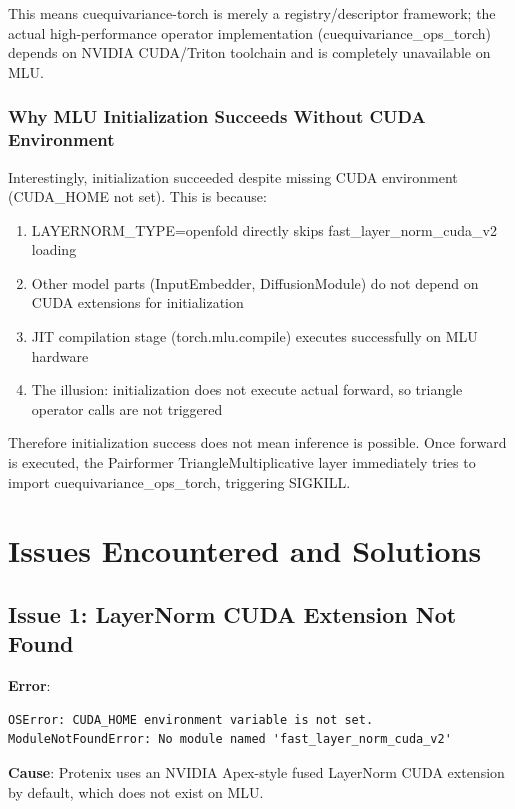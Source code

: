 \documentclass[12pt,a4paper]{article}
\begin{document}
This means cuequivariance-torch is merely a registry/descriptor framework; the actual high-performance operator implementation (cuequivariance_ops_torch) depends on NVIDIA CUDA/Triton toolchain and is completely unavailable on MLU.

\subsubsection{Why MLU Initialization Succeeds Without CUDA Environment}

Interestingly, initialization succeeded despite missing CUDA environment (CUDA_HOME not set). This is because:
\begin{enumerate}
    \item LAYERNORM_TYPE=openfold directly skips fast_layer_norm_cuda_v2 loading
    \item Other model parts (InputEmbedder, DiffusionModule) do not depend on CUDA extensions for initialization
    \item JIT compilation stage (torch.mlu.compile) executes successfully on MLU hardware
    \item The illusion: initialization does not execute actual forward, so triangle operator calls are not triggered
\end{enumerate}

Therefore initialization success does not mean inference is possible. Once forward is executed, the Pairformer TriangleMultiplicative layer immediately tries to import cuequivariance_ops_torch, triggering SIGKILL.

\clearpage

\section{Issues Encountered and Solutions}

\subsection{Issue 1: LayerNorm CUDA Extension Not Found}

\textbf{Error}:
\begin{verbatim}
OSError: CUDA_HOME environment variable is not set.
ModuleNotFoundError: No module named 'fast_layer_norm_cuda_v2'
\end{verbatim}

\textbf{Cause}: Protenix uses an NVIDIA Apex-style fused LayerNorm CUDA extension by default, which does not exist on MLU.
\end{document}
